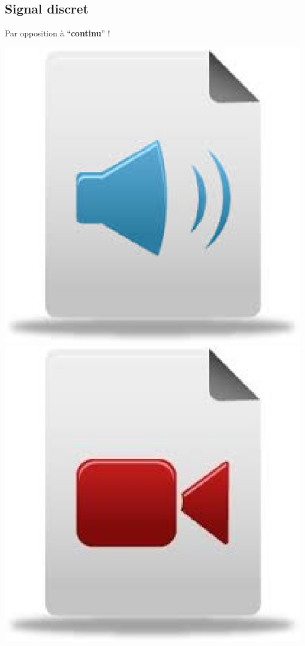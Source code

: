 \documentclass[a4paper,11pt]{beamer}
\begin{document}
\subsection{Signal discret} 
\begin{frame}
\centering
Par opposition à \enquote{\textbf{continu}} !
\vspace{0.5cm}

\centering
\includegraphics[scale=.15]{images/audio.eps}\hspace*{2cm}
\includegraphics[scale=.15]{images/video.eps}\\


\end{frame}
\end{document}

